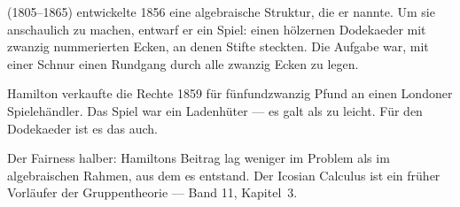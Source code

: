 \begin{geschichte}
 (1805--1865) entwickelte 1856 eine algebraische Struktur, die er  nannte. Um sie anschaulich zu machen, entwarf er ein Spiel: einen hölzernen Dodekaeder mit zwanzig nummerierten Ecken, an denen Stifte steckten. Die Aufgabe war, mit einer Schnur einen Rundgang durch alle zwanzig Ecken zu legen.

Hamilton verkaufte die Rechte 1859 für fünfundzwanzig Pfund an einen Londoner Spielehändler. Das Spiel war ein Ladenhüter --- es galt als zu leicht. Für den Dodekaeder ist es das auch.

\begin{center}
\begin{minipage}{0.9\textwidth}
\end{minipage}
\end{center}

Der Fairness halber: Hamiltons Beitrag lag weniger im Problem als im algebraischen Rahmen, aus dem es entstand. Der Icosian Calculus ist ein früher Vorläufer der Gruppentheorie --- Band 11, Kapitel~3.
\end{geschichte}

